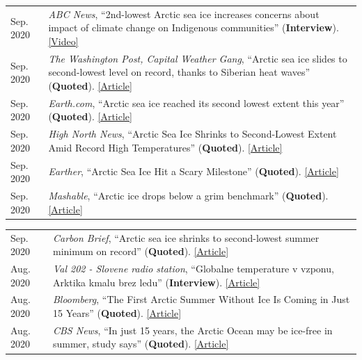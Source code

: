 \documentclass[margin,line,palatino,courier,10pt]{res}
\begin{document}
\begin{resume}
\begin{tabular}{@{}p{0.9in}p{4in}}
Sep. 2020 & \textit{ABC News}, ``2nd-lowest Arctic sea ice increases concerns about impact of climate change on Indigenous communities'' (\textbf{Interview}). \href{https://abcnews.go.com/International/2nd-lowest-arctic-sea-ice-increases-concerns-impact/story?id=73224755}{[Video]}\\
Sep. 2020 & \textit{The Washington Post, Capital Weather Gang}, ``Arctic sea ice slides to second-lowest level on record, thanks to Siberian heat waves'' (\textbf{Quoted}). \href{https://www.washingtonpost.com/weather/2020/09/22/arctic-sea-ice-low/}{[Article]}\\
Sep. 2020 & \textit{Earth.com}, ``Arctic sea ice reached its second lowest extent this year'' (\textbf{Quoted}). \href{https://www.earth.com/news/arctic-sea-ice-reached-its-second-lowest-extent-this-year/}{[Article]}\\
Sep. 2020 & \textit{High North News}, ``Arctic Sea Ice Shrinks to Second-Lowest Extent Amid Record High Temperatures'' (\textbf{Quoted}). \href{https://www.highnorthnews.com/en/arctic-sea-ice-shrinks-second-lowest-extent-amid-record-high-temperatures}{[Article]}\\
Sep. 2020 & \textit{Earther}, ``Arctic Sea Ice Hit a Scary Milestone'' (\textbf{Quoted}). \href{https://earther.gizmodo.com/arctic-sea-ice-hit-a-scary-milestone-1845133739}{[Article]}\\
Sep. 2020 & \textit{Mashable}, ``Arctic ice drops below a grim benchmark'' (\textbf{Quoted}). \href{https://mashable.com/article/arctic-sea-ice-decline-2020/}{[Article]}\\
\end{tabular}
\begin{tabular}{@{}p{0.9in}p{4in}}
Sep. 2020 & \textit{Carbon Brief}, ``Arctic sea ice shrinks to second-lowest summer minimum on record'' (\textbf{Quoted}). \href{https://www.carbonbrief.org/arctic-sea-ice-shrinks-to-second-lowest-summer-minimum-on-record}{[Article]}\\
Aug. 2020 & \textit{Val 202 - Slovene radio station}, ``Globalne temperature v vzponu, Arktika kmalu brez ledu'' (\textbf{Interview}). \href{https://val202.rtvslo.si/2020/08/aktualno-20/}{[Article]}\\
Aug. 2020 & \textit{Bloomberg}, ``The First Arctic Summer Without Ice Is Coming in Just 15 Years'' (\textbf{Quoted}). \href{https://www.bloomberg.com/news/articles/2020-08-17/the-first-arctic-summer-without-ice-is-coming-in-just-15-years?srnd=premium}{[Article]}\\
Aug. 2020 & \textit{CBS News}, ``In just 15 years, the Arctic Ocean may be ice-free in summer, study says'' (\textbf{Quoted}). \href{https://www.cbsnews.com/news/arctic-ocean-climate-change-ice-free-15-years/}{[Article]}\\

\end{tabular}
\end{resume}
\end{document}
